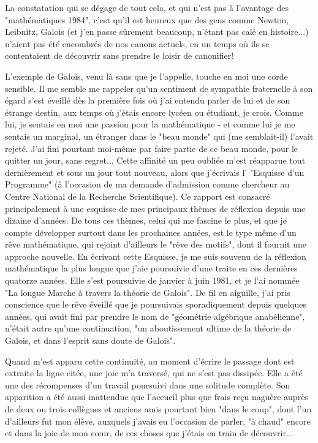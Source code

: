 La constatation qui se dégage de tout cela, et qui n'est pas à l'avantage des "mathématiques 1984", c'est qu'il est heureux que des gens comme Newton, Leibnitz, Galois (et j'en passe sûrement beaucoup, n'étant pas calé en histoire...) n'aient pas été encombrés de nos canons actuels, en un temps où ils se contentaient de découvrir sans prendre le loisir de canonifier!

L'exemple de Galois, venu là sans que je l'appelle, touche en moi une corde sensible. Il me semble me rappeler qu'un sentiment de sympathie fraternelle à son égard s'est éveillé dès la première fois où j'ai entendu parler de lui et de son étrange destin, aux temps où j'étais encore lycéen ou étudiant, je crois. Comme lui, je sentais en moi une passion pour la mathématique - et comme lui je me sentais un marginal, un étranger dans le "beau monde" qui (me semblait-il) l'avait rejeté. J'ai fini pourtant moi-même par faire partie de ce beau monde, pour le quitter un jour, sans regret... Cette affinité un peu oubliée m'est réapparue tout dernièrement et sous un jour tout nouveau, alors que j'écrivais l' "Esquisse d'un Programme" (à l'occasion de ma demande d'admission comme chercheur au Centre National de la Recherche Scientifique). Ce rapport est consacré principalement à une esquisse de mes principaux thèmes de réflexion depuis une dizaine d'années. De tous ces thèmes, celui qui me fascine le plus, et que je compte développer surtout dans les prochaines années, est le type même d'un rêve mathématique, qui rejoint d'ailleurs le "rêve des motifs", dont il fournit une approche nouvelle. En écrivant cette Esquisse, je me suis souvenu de la réflexion mathématique la plus longue que j'aie poursuivie d'une traite en ces dernières quatorze années. Elle s'est poursuivie de janvier à juin 1981, et je l'ai nommée "La longue Marche à travers la théorie de Galois". De fil en aiguille, j'ai pris conscience que le rêve éveillé que je poursuivais sporadiquement depuis quelques années, qui avait fini par prendre le nom de "géométrie algébrique anabélienne", n'était autre qu'une continuation, "un aboutissement ultime de la théorie de Galois, et dans l'esprit sans doute de Galois".

Quand m'est apparu cette continuité, au moment d'écrire le passage dont est extraite la ligne citée, une joie m'a traversé, qui ne s'est pas dissipée. Elle a été une des récompenses d'un travail poursuivi dans une solitude complète. Son apparition a été aussi inattendue que l'accueil plus que frais reçu naguère auprès de deux ou trois collègues et anciens amis pourtant bien "dans le coup", dont l'un d'ailleurs fut mon élève, auxquels j'avais eu l'occasion de parler, "à chaud" encore et dans la joie de mon cœur, de ces choses que j'étais en train de découvrir...

